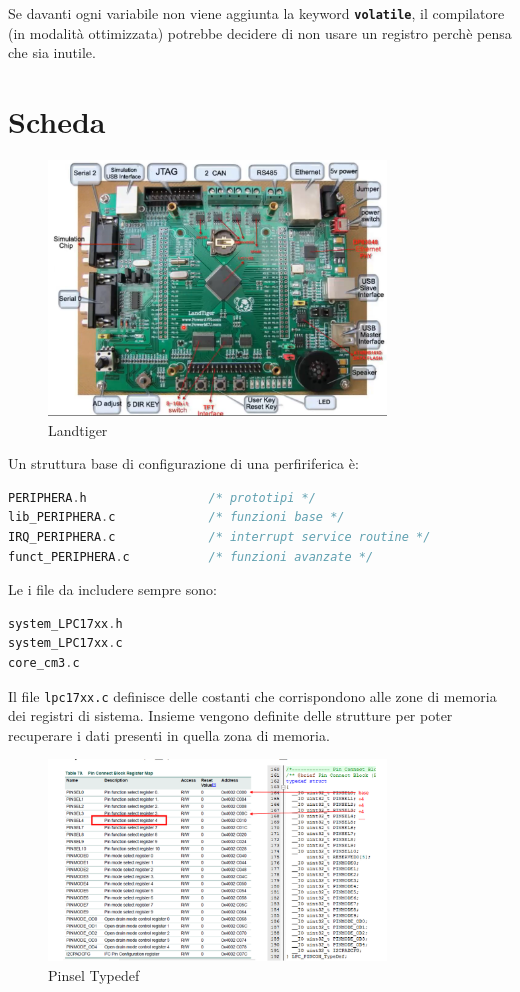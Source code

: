 \documentclass[12pt]{article}
\begin{document}
Se davanti ogni variabile non viene aggiunta la keyword \texttt{\textbf{volatile}}, il compilatore (in modalit\`a ottimizzata) potrebbe decidere di non usare un registro perch\`e pensa che sia inutile.




\section{Scheda}
\begin{figure}[H]
    \centering
    \includegraphics[width=0.8\textwidth]{landtiger.png}
    \caption{Landtiger}
    \label{fig:landtiger}
\end{figure}
Un struttura base di configurazione di una perfiriferica \`e:
\begin{lstlisting}[language=C]
PERIPHERA.h                 /* prototipi */
lib_PERIPHERA.c             /* funzioni base */
IRQ_PERIPHERA.c             /* interrupt service routine */
funct_PERIPHERA.c           /* funzioni avanzate */
\end{lstlisting}
Le i file da includere sempre sono:
\begin{lstlisting}[language=c]
system_LPC17xx.h
system_LPC17xx.c
core_cm3.c
\end{lstlisting}

Il file \texttt{lpc17xx.c} definisce delle costanti che corrispondono alle zone di memoria dei registri di sistema. Insieme vengono definite delle strutture per poter recuperare i dati presenti in quella zona di memoria.
\begin{figure}[H]
    \centering
    \includegraphics[width=0.8\textwidth]{pinsel-typedef.png}
    \caption{Pinsel Typedef}
    \label{fig:pinsel-typedef}
\end{figure}
\end{document}
